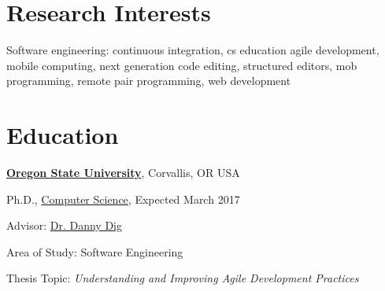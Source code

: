 \documentclass[10pt]{article}
\begin{document}


% 
\thispagestyle{empty}
\section{Research Interests}

Software engineering: 
continuous integration,
cs education
agile development,  
mobile computing,
next generation code editing,
structured editors,
mob programming,
remote pair programming,
web development 


\vspace{-5pt}

\section{Education}

\href{http://www.oregonstate.edu/}{\textbf{Oregon State University}},
Corvallis, OR USA
\begin{outerlist}
\item[] Ph.D.,
        \vspace{-.2\baselineskip}
        \href{http://eecs.oregonstate.edu/}
             {Computer Science},
             Expected March 2017
        \begin{innerlist}
        \item Advisor:
              \href{http://dig.cs.illinois.edu/}
                   {Dr. Danny Dig}
        \item Area of Study: Software Engineering 
        \item Thesis Topic: \emph{Understanding and Improving Agile Development Practices}

        \end{innerlist}
\end{outerlist}
\vspace{.5\baselineskip}
\end{document}
